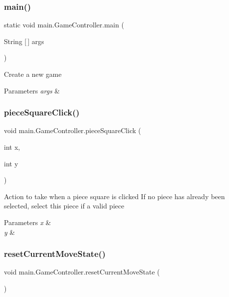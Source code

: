 \subsubsection{\texorpdfstring{main()}{main()}}
{\footnotesize\ttfamily static void main.\+Game\+Controller.\+main (\begin{DoxyParamCaption}\item[{String \mbox{[}$\,$\mbox{]}}]{args }\end{DoxyParamCaption})\hspace{0.3cm}{\ttfamily [static]}}

Create a new game 
\begin{DoxyParams}{Parameters}
{\em args} & \\
\hline
\end{DoxyParams}
\hypertarget{classmain_1_1_game_controller_a46df83552d6ea7c824e3eb13dc95d6c4}{}\label{classmain_1_1_game_controller_a46df83552d6ea7c824e3eb13dc95d6c4} 
\subsubsection{\texorpdfstring{piece\+Square\+Click()}{pieceSquareClick()}}
{\footnotesize\ttfamily void main.\+Game\+Controller.\+piece\+Square\+Click (\begin{DoxyParamCaption}\item[{int}]{x,  }\item[{int}]{y }\end{DoxyParamCaption})}

Action to take when a piece square is clicked If no piece has already been selected, select this piece if a valid piece 
\begin{DoxyParams}{Parameters}
{\em x} & \\
\hline
{\em y} & \\
\hline
\end{DoxyParams}
\hypertarget{classmain_1_1_game_controller_a810118fdb7712c718031ecc6464f3123}{}\label{classmain_1_1_game_controller_a810118fdb7712c718031ecc6464f3123} 
\subsubsection{\texorpdfstring{reset\+Current\+Move\+State()}{resetCurrentMoveState()}}
{\footnotesize\ttfamily void main.\+Game\+Controller.\+reset\+Current\+Move\+State (\begin{DoxyParamCaption}{ }\end{DoxyParamCaption})}

